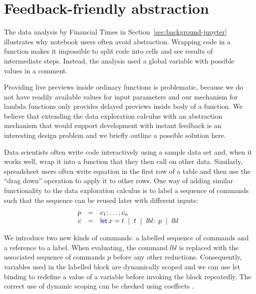 \documentclass[english,submission]{programming}
\theoremstyle{plain}
\theoremstyle{definition}
\newcommand{\lsep}{\;\;|\;\;}
\newcommand{\kvd}[1]{\textnormal{\textcolor{kvdclr}{\sffamily #1}}}
\begin{document}

\section{Feedback-friendly abstraction}
\label{sec:extra-abstraction}

The data analysis by Financial Times in Section~\ref{sec:background-jupyter} illustrates why
notebook users often avoid abstraction. Wrapping code in a function makes it impossible to
split code into cells and see results of intermediate steps. Instead, the analysis used a
global variable with possible values in a comment.

Providing live previews inside ordinary functions is problematic, because we do not have readily
available values for input parameters and our mechanism for lambda functions only provides
delayed previews inside body of a function. We believe that extending the data exploration calculus
with an abstraction mechanism that would support development with instant feedback is an
interesting design problem and we briefly outline a possible solution here.

Data scientists often write code interactively using a sample data set and, when it works well,
wrap it into a function that they then call on other data. Similarly, spreadsheet users
often write equation in the first row of a table and then use the ``drag down'' operation to
apply it to other rows. One way of adding similar functionality to the data exploration calculus
is to label a sequence of commands such that the sequence can be reused later with different
inputs:
%
\begin{equation*}
\begin{array}{rcl}
p &=& c_1; \ldots; c_n\\
c &=& \kvd{let}\,x=t \lsep t \lsep \textit{lbl}\!:\,p \lsep \textit{lbl}
\end{array}
\end{equation*}

\noindent
We introduce two new kinds of commands: a labelled sequence of commands and a reference to a label.
When evaluating, the command $\textit{lbl}$ is replaced with the associated sequence of
commands $p$ before any other reductions. Consequently, variables used in the labelled block are
dynamically scoped and we can use let binding to redefine a value of a variable before invoking
the block repeatedly. The correct use of dynamic scoping can be checked using
coeffects \cite{coeffects}.
\end{document}
